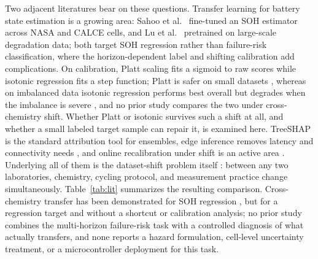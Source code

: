 \documentclass[11pt,a4paper]{article}
\begin{document}
Two adjacent literatures bear on these questions. Transfer learning for battery state estimation is a growing area: Sahoo et al.\ \cite{sahoo2022transfer} fine-tuned an SOH estimator across NASA and CALCE cells, and Lu et al.\ \cite{lu2023deep} pretrained on large-scale degradation data; both target SOH regression rather than failure-risk classification, where the horizon-dependent label and shifting calibration add complications. On calibration, Platt scaling \cite{platt1999probabilistic} fits a sigmoid to raw scores while isotonic regression \cite{zadrozny2002transforming} fits a step function; Platt is safer on small datasets \cite{niculescu2005predicting}, whereas on imbalanced data isotonic regression performs best overall but degrades when the imbalance is severe \cite{huang2020experimental}, and no prior study compares the two under cross-chemistry shift. Whether Platt or isotonic survives such a shift at all, and whether a small labeled target sample can repair it, is examined here. TreeSHAP \cite{lundberg2020from} is the standard attribution tool for ensembles, edge inference removes latency and connectivity needs \cite{grzesik2024combining}, and online recalibration under shift is an active area \cite{gupta2023online}. Underlying all of them is the dataset-shift problem itself \cite{moreno2012unifying}: between any two laboratories, chemistry, cycling protocol, and measurement practice change simultaneously. Table~\ref{tab:lit} summarizes the resulting comparison. Cross-chemistry transfer has been demonstrated for SOH regression \cite{lu2023deep}, but for a regression target and without a shortcut or calibration analysis; no prior study combines the multi-horizon failure-risk task with a controlled diagnosis of what actually transfers, and none reports a hazard formulation, cell-level uncertainty treatment, or a microcontroller deployment for this task.
\end{document}
